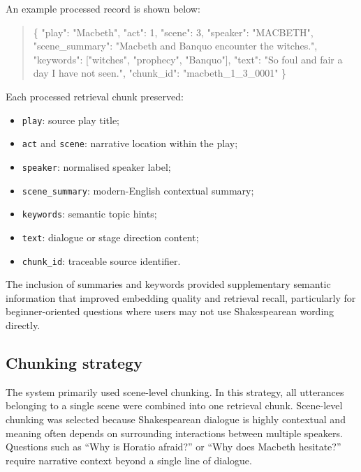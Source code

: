 \documentclass[10pt,conference]{IEEEtran}
\begin{document}
An example processed record is shown below:
\begin{quote}
	\small
	\begin{ttfamily}
		\begin{flushleft}
			\{
			\newline
			"play": "Macbeth",
			\newline
			"act": 1,
			\newline
			"scene": 3,
			\newline
			"speaker": "MACBETH",
			\newline
			"scene\_summary": "Macbeth and Banquo encounter the witches.",
			\newline
			"keywords": ["witches", "prophecy", "Banquo"],
			\newline
			"text": "So foul and fair a day I have not seen.",
			\newline
			"chunk\_id": "macbeth\_1\_3\_0001"
			\newline
			\}
		\end{flushleft}
	\end{ttfamily}
\end{quote}
Each processed retrieval chunk preserved:
\begin{itemize}
	\item \texttt{play}: source play title;
	\item \texttt{act} and \texttt{scene}: narrative location within the play;
	\item \texttt{speaker}: normalised speaker label;
	\item \texttt{scene\_summary}: modern-English contextual summary;
	\item \texttt{keywords}: semantic topic hints;
	\item \texttt{text}: dialogue or stage direction content;
	\item \texttt{chunk\_id}: traceable source identifier.
\end{itemize}

The inclusion of summaries and keywords provided supplementary semantic information that improved embedding quality and retrieval recall, particularly for beginner-oriented questions where users may not use Shakespearean wording directly.
\subsection{Chunking strategy}


The system primarily used scene-level chunking. In this strategy, all utterances belonging to a single scene were combined into one retrieval chunk. Scene-level chunking was selected because Shakespearean dialogue is highly contextual and meaning often depends on surrounding interactions between multiple speakers. Questions such as ``Why is Horatio afraid?'' or ``Why does Macbeth hesitate?'' require narrative context beyond a single line of dialogue.
\end{document}
